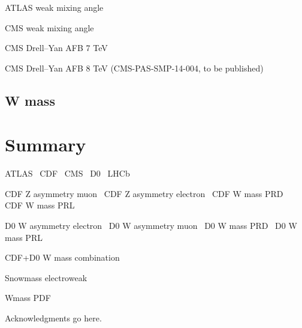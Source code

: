 \documentclass[12pt]{iopart}
\begin{document}
ATLAS weak mixing angle~\cite{Aad:2015uau}

CMS weak mixing angle~\cite{Chatrchyan:2011ya}

CMS Drell--Yan AFB 7 TeV~\cite{Chatrchyan:2012dc}

CMS Drell--Yan AFB 8 TeV (CMS-PAS-SMP-14-004, to be published)

\subsection{W mass}

\section{Summary}


ATLAS~\cite{Aad:2008zzm}
CDF~\cite{Abulencia:2005ix}
CMS~\cite{CMSdetector}
D0~\cite{Abazov:2005pn}
LHCb~\cite{Alves:2008zz}

CDF Z asymmetry muon~\cite{Aaltonen:2014loa}
CDF Z asymmetry electron~\cite{Aaltonen:2013wcp}
CDF W mass PRD~\cite{Aaltonen:2013vwa}
CDF W mass PRL~\cite{Aaltonen:2012bp}

D0 W asymmetry electron~\cite{Abazov:2013dsa}
D0 W asymmetry muon~\cite{Abazov:2013rja}
D0 W mass PRD~\cite{D0:2013jba}
D0 W mass PRL~\cite{Abazov:2012bv}

CDF+D0 W mass combination~\cite{Aaltonen:2013iut}

Snowmass electroweak~\cite{Baak:2013fwa}

Wmass PDF~\cite{Bozzi:2011ww}

\ack
Acknowledgments go here. 



\end{document}
